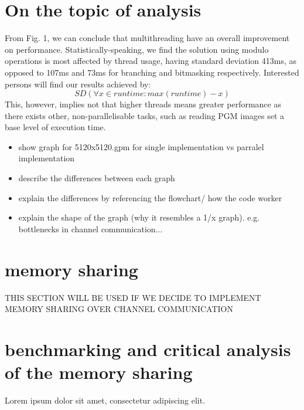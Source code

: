 \documentclass[twoside,twocolumn]{article}
\begin{document}
\section{On the topic of analysis}

From Fig. 1, we can conclude that multithreading have an overall improvement on performance.
Statistically-speaking, we find the solution using 
modulo operations is most affected by thread usage, having standard deviation 413ms, as opposed to 107ms 
and 73ms for branching and bitmasking respectively. Interested persons will find our results achieved by:
\[SD(\forall x \in runtime : max(runtime) - x)\]
This, however, implies not that higher threads means greater 
performance as there exists other, non-parallelisable tasks, such as reading 
PGM images set a base level of execution time. 
\begin{itemize}
  \item show graph for 5120x5120.gpm for single implementation vs parralel implementation
  \item describe the differences between each graph
  \item explain the differences by referencing the flowchart/ how the code worker
  \item explain the shape of the graph (why it resembles a 1/x graph). e.g. bottlenecks in channel communication...
\end{itemize}

\section{memory sharing}

THIS SECTION WILL BE USED IF WE DECIDE TO IMPLEMENT MEMORY SHARING OVER CHANNEL COMMUNICATION

\section{benchmarking and critical analysis of the memory sharing}

Lorem ipsum dolor sit amet, consectetur adipiscing elit.
\blindtext %

\end{document}
